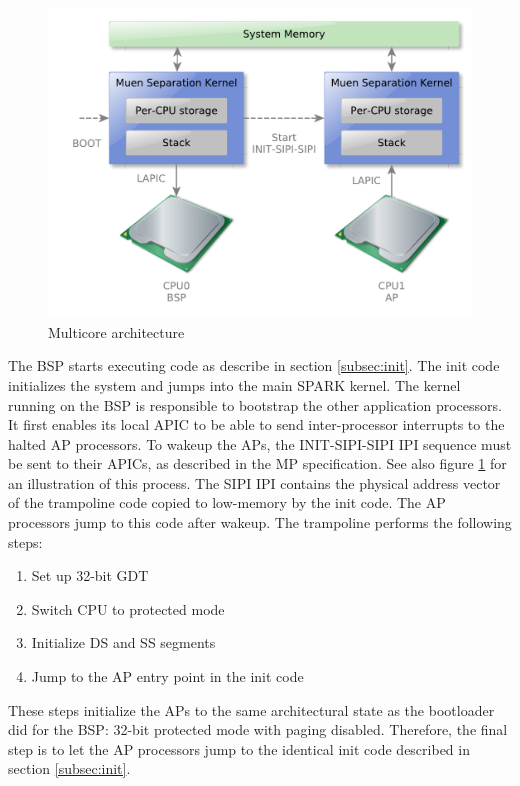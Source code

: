 \begin{figure}[h]
	\centering
	\includegraphics[scale=0.6]{images/mp-overview}
	\caption{Multicore architecture}
	\label{fig:mp-overview}
\end{figure}

The BSP starts executing code as describe in section \ref{subsec:init}. The
init code initializes the system and jumps into the main SPARK kernel. The
kernel running on the BSP is responsible to bootstrap the other application
processors. It first enables its local APIC to be able to send
inter-processor interrupts to the halted AP processors. To wakeup the APs, the
INIT-SIPI-SIPI IPI sequence must be sent to their APICs, as described in the MP
specification. See also figure \ref{fig:mp-overview} for an illustration of
this process. The SIPI IPI contains the physical address vector of the
trampoline code copied to low-memory by the init code. The AP processors jump
to this code after wakeup. The trampoline performs the following steps:

\begin{enumerate}
	\item Set up 32-bit GDT
	\item Switch CPU to protected mode
	\item Initialize DS and SS segments
	\item Jump to the AP entry point in the init code
\end{enumerate}

These steps initialize the APs to the same architectural state as the
bootloader did for the BSP: 32-bit protected mode with paging disabled.
Therefore, the final step is to let the AP processors jump to the identical
init code described in section \ref{subsec:init}.

